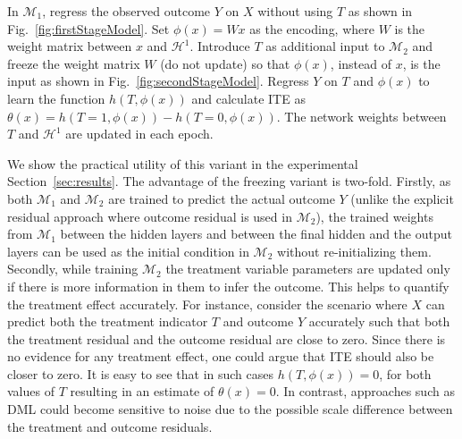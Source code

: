 \documentclass[sigconf]{acmart}
\theoremstyle{plain}
\numberwithin{equation}{section}
\begin{document}
\begin{algorithm}[t]%
 \caption{The \emph{freezing} variant of CDNN}
 \label{algo:freezing}
\begin{algorithmic}[1]
\State In $\mathcal{M}_1$, regress the observed outcome $Y$ on $X$ without using $T$ as shown in Fig.~\ref{fig:firstStageModel}.
\State Set $\phi(x) = Wx$ as the encoding, where $W$ is the weight matrix between $x$ and $\mathcal{H}^1$.
\State Introduce $T$ as additional input to $\mathcal{M}_2$ and freeze the weight matrix $W$ (do not update) so that $\phi(x)$, instead of $x$, is the input as shown in Fig.~\ref{fig:secondStageModel}.
\State Regress $Y$ on $T$ and $\phi(x)$ to learn the function $h(T,\phi(x))$ and calculate ITE as $\theta(x) = h(T=1,\phi(x)) - h(T=0,\phi(x))$. The network weights between $T$ and $\mathcal{H}^1$ are updated in each epoch.
\end{algorithmic}
\end{algorithm}
We show the practical utility of this variant in the experimental Section~\ref{sec:results}. The advantage of the freezing variant is two-fold. Firstly, as both $\mathcal{M}_1$ and $\mathcal{M}_2$ are trained to predict the actual outcome $Y$ (unlike the explicit residual approach where outcome residual is used in $\mathcal{M}_2$), the trained weights from $\mathcal{M}_1$ between the hidden layers and between the final hidden and the output layers can be used as the initial condition in $\mathcal{M}_2$ without re-initializing them. Secondly, while training $\mathcal{M}_2$ the treatment variable parameters are updated only if there is more information in them to infer the outcome. This helps to quantify the treatment effect accurately. For instance, consider the scenario where $X$ can predict both the treatment indicator $T$ and outcome $Y$ accurately such that both the treatment residual and the outcome residual are close to zero. Since there is no evidence for any treatment effect, one could argue that ITE should also be closer to zero. It is easy to see that in such cases $h(T,\phi(x)) = 0$, for both values of $T$ resulting in an estimate of $\theta(x)=0$. In contrast, approaches such as DML could become sensitive to noise due to the possible scale difference between the treatment and outcome residuals. 
\end{document}

